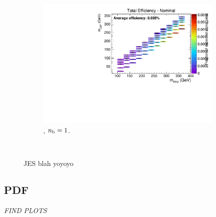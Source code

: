 \begin{figure}[ht!]
\begin{subfigure}[b]{0.32\textwidth}
    \includegraphics[width=\textwidth, page=6]{Figs/sms/t2cc/v24/JES_T2cc_v24_eq1b_ge4j_incl.pdf}
    \caption{\njhigh, $n_{\text{b}} = 1$.}
    \label{fig:sms-jes-t2cc-ge4j-1b}
  \end{subfigure}\\
  \caption{JES blah yoyoyo}
  \label{fig:sms-jes-t2cc}
\end{figure}


\newpage
\subsection*{PDF}
\label{sec:t2cc_pdf_plots}
\emph{FIND PLOTS}



\newpage

